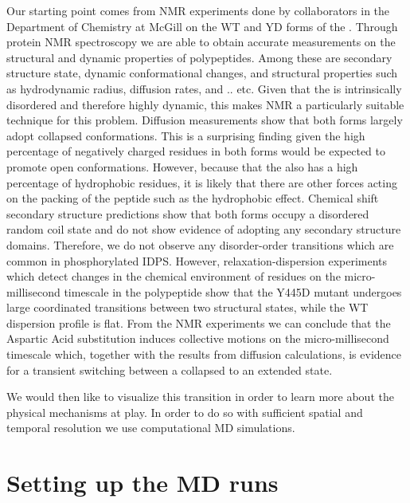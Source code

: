 Our starting point comes from NMR experiments done by collaborators in the Department of Chemistry at McGill on the WT and YD forms of the \gct{}. Through protein NMR spectroscopy we are able to obtain accurate measurements on the structural and dynamic properties of polypeptides. Among these are secondary structure state, dynamic conformational changes, and structural properties such as hydrodynamic radius, diffusion rates, and .. etc. Given that the \gct{} is intrinsically disordered and therefore highly dynamic, this makes NMR a particularly suitable technique for this problem. Diffusion measurements show that both forms largely adopt collapsed conformations.  This is a surprising finding given the high percentage of negatively charged residues  in both forms would be expected to promote open conformations. However, because that the \gct{} also has a high percentage of hydrophobic residues,  it is likely that there are other forces acting on the packing of the peptide such as the hydrophobic effect. Chemical shift secondary structure predictions show that both forms occupy a disordered random coil state and do not show evidence of adopting any secondary structure domains. Therefore, we do not observe any disorder-order transitions which are common in phosphorylated IDPS. However, relaxation-dispersion experiments which detect changes in the chemical environment of residues on the micro-millisecond timescale in the polypeptide show that the Y445D mutant undergoes large coordinated transitions between two structural states, while the WT dispersion profile is flat. From the NMR experiments we can conclude that the Aspartic Acid substitution induces collective motions on the micro-millisecond timescale which, together with the results from diffusion calculations, is evidence for a transient switching between a collapsed to an extended state. 

We would then like to visualize this transition in order to learn more about the physical mechanisms at play. In order to do so with sufficient spatial and temporal resolution we use computational MD simulations. 

\section{Setting up the MD runs}

